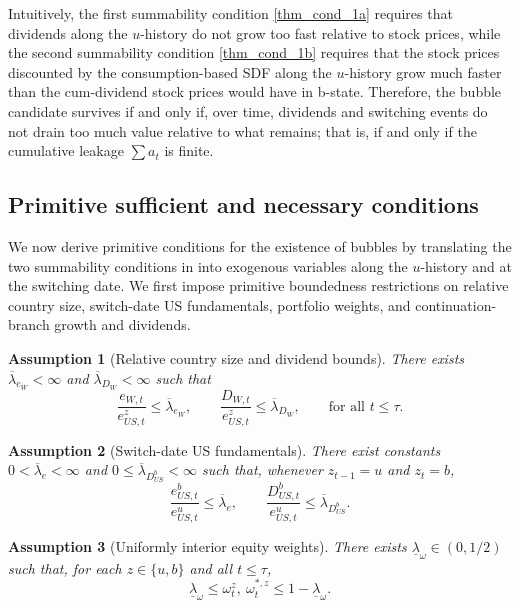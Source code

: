 \documentclass[12pt]{article}
\theoremstyle{plain}
\newtheorem{ass}{Assumption}
\begin{document}
Intuitively, the first summability condition \eqref{thm_cond_1a} requires that dividends along the $u$-history 
do not grow too fast relative to stock prices, while the second summability condition \eqref{thm_cond_1b} requires that the stock prices discounted by the consumption-based SDF along the $u$-history grow much faster than the cum-dividend stock prices would have in b-state. Therefore, the bubble candidate survives if and only if,
 over time, dividends and switching events do not drain too much value relative to what remains; that is, 
 if and only if the cumulative leakage $\sum a_t$ is finite.

\subsection{Primitive sufficient and necessary conditions}

We now derive primitive conditions for the existence of bubbles by translating the two summability conditions
in  into exogenous variables along the $u$-history and at the switching date. We first impose
primitive boundedness restrictions on relative country size, switch-date US fundamentals, portfolio weights,
and continuation-branch growth and dividends.

\begin{ass}[Relative country size and dividend bounds]\label{ass_relative_dividend_bounds}
There exists $\overline\lambda_{e_W}<\infty$ and $\overline\lambda_{D_W}<\infty$ such that
\[
\frac{e_{W,t}}{e_{US,t}^z}\le \overline\lambda_{e_W},
\qquad
\frac{D_{W,t}}{e_{US,t}^z}\le \overline\lambda_{D_W},
\qquad\text{for all }t\le \tau.
\]
\end{ass}

\begin{ass}[Switch-date US fundamentals]\label{ass_switch_us_fundamentals}
There exist constants $0< \overline\lambda_e<\infty$ and
$0\le \overline\lambda_{D^b_{US}}<\infty$ such that, whenever $z_{t-1}=u$ and $z_t=b$,
\[
\frac{e_{US,t}^b}{e_{US,t}^u}
\le
\overline\lambda_e,
\qquad
\frac{D_{US,t}^b}{e_{US,t}^u}
\le
\overline\lambda_{D^b_{US}}.
\]
\end{ass}

\begin{ass}[Uniformly interior equity weights]\label{ass_interior_equity_weights}
There exists $\underline\lambda_\omega\in(0,1/2)$ such that, for each
$z\in\{u,b\}$ and all $t\le \tau$,
\[
\underline\lambda_\omega
\le
\omega_t^z,\ \omega_t^{*,z}
\le
1-\underline\lambda_\omega.
\]
\end{ass}
\end{document}
